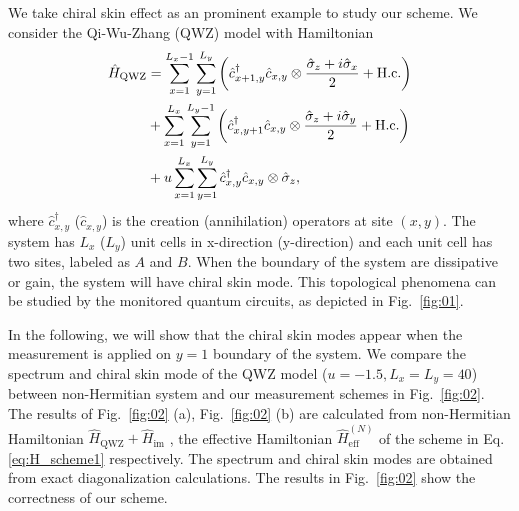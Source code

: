 \documentclass[longbibliography, aps, prx, amsmath, amssymb, amsfonts, twocolumn,superscriptaddress, footinbib]{revtex4-1}
\begin{document}
	We take chiral skin effect as an prominent example to study our scheme. We consider the Qi-Wu-Zhang (QWZ) model with Hamiltonian
	\begin{align}
		\hat{H}_{\text{QWZ}} &=  \sum_{{x}=1}^{L_{x}-1} \sum_{{y}=1}^{L_{y}}\left(\hat{c}_{{x}+1, {y}}^{\dagger} \hat{c}_{{x}, {y}} \otimes \frac{\hat{\sigma}_{z}+i \hat{\sigma}_{x}}{2}+\mathrm{H.c.}\right) \notag\\
		& +\sum_{{x}=1}^{L_{x}} \sum_{{y}=1}^{L_{y}-1}\left(\hat{c}_{{x}, {y}+1}^{\dagger} \hat{c}_{{x}, {y}} \otimes \frac{\hat{\sigma}_{z}+i \hat{\sigma}_{y}}{2}+\mathrm{H.c.}\right) \notag\\
		& +u \sum_{{x}=1}^{L_{x}} \sum_{{y}=1}^{L_{y}} \hat{c}_{{x}, {y}}^{\dagger} \hat{c}_{{x}, {y}} \otimes \hat{\sigma}_{z},
	\end{align}
	where $\hat{c}_{{x}, {y}}^{\dagger}$ ($\hat{c}_{{x}, {y}}$) is the creation (annihilation) operators at site $({x},{y})$. The system has $L_x$ ($L_y$) unit cells in x-direction (y-direction) and each unit cell has two sites, labeled as $A$ and $B$.
	When the boundary of the system are dissipative or gain, the system will have chiral skin mode. This topological phenomena can be studied by the monitored quantum circuits, as depicted in Fig.~\ref{fig:01}. 


	In the following, we will show that the chiral skin modes appear when the measurement is applied on $y=1$ boundary of the system. We compare the spectrum and chiral skin mode of the QWZ model ($u=-1.5, L_x=L_y=40$) between non-Hermitian system and our measurement schemes in Fig.~\ref{fig:02}. The results of Fig.~\ref{fig:02} (a), Fig.~\ref{fig:02} (b) are calculated from non-Hermitian Hamiltonian $\hat{H}_{\text{QWZ}} + \hat{H}_{\text{im}}$ , the effective Hamiltonian $\hat{H}_{\text{eff}}^{(N)}$ of the  scheme in Eq.\ref{eq:H_scheme1} respectively. 
	The spectrum and chiral skin modes are obtained from exact diagonalization calculations. The results in Fig.~\ref{fig:02} show the correctness of our scheme.
\end{document}

